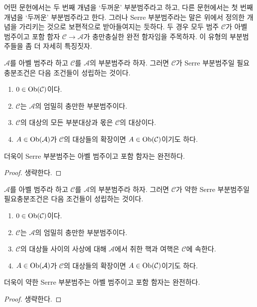 \noindent
어떤 문헌에서는 두 번째 개념을 ‘두꺼운’ 부분범주라고 하고,
다른 문헌에서는 첫 번째 개념을 ‘두꺼운’ 부분범주라고 한다.
그러나 Serre 부분범주라는 말은 위에서 정의한 개념을 가리키는 것으로
보편적으로 받아들여지는 듯하다. 두 경우 모두 범주 $\mathcal{C}$가
아벨 범주이고 포함 함자 $\mathcal{C} \to \mathcal{A}$가 충만충실한
완전 함자임을 주목하자. 이 유형의 부분범주들을 좀 더 자세히 특징짓자.

\begin{lemma}
\label{lemma-characterize-serre-subcategory}
$\mathcal{A}$를 아벨 범주라 하고 $\mathcal{C}$를 $\mathcal{A}$의
부분범주라 하자. 그러면 $\mathcal{C}$가 Serre 부분범주일
필요충분조건은 다음 조건들이 성립하는 것이다.
\begin{enumerate}
\item $0 \in \mathop{\mathrm{Ob}}\nolimits(\mathcal{C})$이다.
\item $\mathcal{C}$는 $\mathcal{A}$의 엄밀히 충만한 부분범주이다.
\item $\mathcal{C}$의 대상의 모든 부분대상과 몫은
$\mathcal{C}$의 대상이다.
\item $A \in \mathop{\mathrm{Ob}}\nolimits(\mathcal{A})$가 $\mathcal{C}$의 대상들의 확장이면
$A \in \mathop{\mathrm{Ob}}\nolimits(\mathcal{C})$이기도 하다.
\end{enumerate}
더욱이 Serre 부분범주는 아벨 범주이고 포함 함자는 완전하다.
\end{lemma}

\begin{proof}
생략한다.
\end{proof}

\begin{lemma}
\label{lemma-characterize-weak-serre-subcategory}
$\mathcal{A}$를 아벨 범주라 하고 $\mathcal{C}$를 $\mathcal{A}$의
부분범주라 하자. 그러면 $\mathcal{C}$가 약한 Serre 부분범주일
필요충분조건은 다음 조건들이 성립하는 것이다.
\begin{enumerate}
\item $0 \in \mathop{\mathrm{Ob}}\nolimits(\mathcal{C})$이다.
\item $\mathcal{C}$는 $\mathcal{A}$의 엄밀히 충만한 부분범주이다.
\item $\mathcal{C}$의 대상들 사이의 사상에 대해 $\mathcal{A}$에서
취한 핵과 여핵은 $\mathcal{C}$에 속한다.
\item $A \in \mathop{\mathrm{Ob}}\nolimits(\mathcal{A})$가 $\mathcal{C}$의 대상들의 확장이면
$A \in \mathop{\mathrm{Ob}}\nolimits(\mathcal{C})$이기도 하다.
\end{enumerate}
더욱이 약한 Serre 부분범주는 아벨 범주이고 포함 함자는 완전하다.
\end{lemma}

\begin{proof}
생략한다.
\end{proof}

